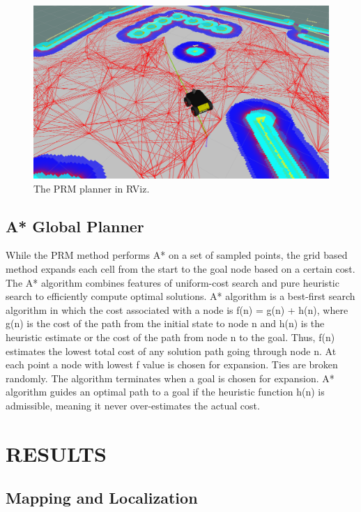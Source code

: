 \documentclass[letterpaper, 10 pt, conference]{ieeeconf}  %
\begin{document}
	\begin{figure}[!ht]
		\centering
		\includegraphics[width=1.0\columnwidth]{Figures/PRM_CloseUP}
		\caption{The PRM planner in RViz.}
		\label{PRM_planner}
	\end{figure}

\subsection{A* Global Planner}

While the PRM method performs A* on a set of sampled points, the grid based method expands each cell from the start to the goal node based on a certain cost. The A* algorithm combines features of uniform-cost search and pure heuristic search to efficiently compute optimal solutions. A* algorithm is a best-first search algorithm in which the cost associated with a node is f(n) = g(n) + h(n), where g(n) is the cost of the path from the initial state to node n and h(n) is the heuristic estimate or the cost of the path from node n to the goal. Thus, f(n) estimates the lowest total cost of any solution path going through node n. At each point a node with lowest f value is chosen for expansion. Ties are broken randomly. The algorithm terminates when a goal is chosen for expansion. A* algorithm guides an optimal path to a goal if the heuristic function h(n) is admissible, meaning it never over-estimates the actual cost.

\section{RESULTS}

\subsection{Mapping and Localization}
\end{document}
